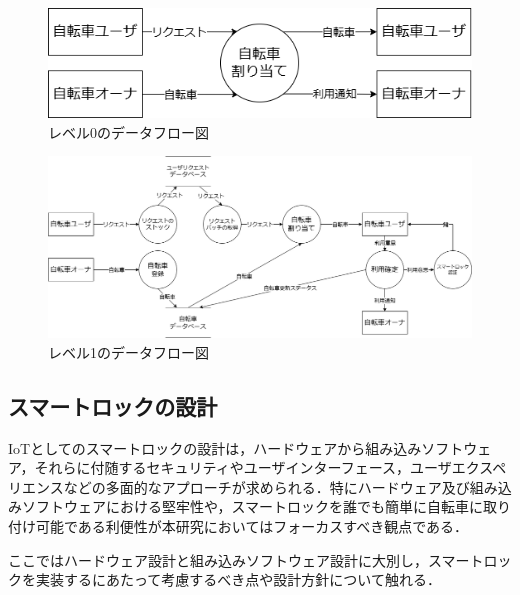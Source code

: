           \begin{figure}[htbp]
            \centering
            \includegraphics[scale=0.4]
            {figures/dfd-level0.drawio.png}
            \caption{レベル0のデータフロー図}
            \label{fig:レベル0のデータフロー図}
          \end{figure}

          \begin{figure}[htbp]
            \centering
            \includegraphics[scale=0.4]
            {figures/dfd-level1.drawio.png}
            \caption{レベル1のデータフロー図}
            \label{fig:レベル1のデータフロー図}
          \end{figure}

  \subsection{スマートロックの設計}
    \label{sec:スマートロックの設計}
      \par IoTとしてのスマートロックの設計は，ハードウェアから組み込みソフトウェア，それらに付随するセキュリティやユーザインターフェース，ユーザエクスペリエンスなどの多面的なアプローチが求められる．特にハードウェア及び組み込みソフトウェアにおける堅牢性や，スマートロックを誰でも簡単に自転車に取り付け可能である利便性が本研究においてはフォーカスすべき観点である．
      \par ここではハードウェア設計と組み込みソフトウェア設計に大別し，スマートロックを実装するにあたって考慮するべき点や設計方針について触れる．
      
